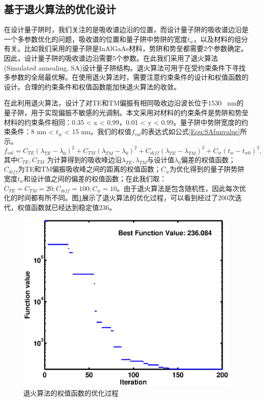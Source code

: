 \subsection{基于退火算法的优化设计}
在设计量子阱时，我们关注的是吸收谱边沿的位置，而设计量子阱的吸收谱边沿是一个多参数优化的问题，吸收谱的位置和量子阱中势阱的宽度$t_w$，以及材料的组分有关。比如我们采用的量子阱是InAlGaAs材料，势阱和势垒都需要2个参数确定。因此，设计量子阱的吸收谱边沿需要5个参数。在此我们采用了退火算法(Simulated annealing, SA)\cite{Kirkpatrick671}设计量子阱结构。退火算法可用于在受约束条件下寻找多参数的全局最优解。在使用退火算法时，需要注意约束条件的设计和权值函数的设计。合理的约束条件和权值函数能加快退火算法的收敛。

在此利用退火算法，设计了对TE和TM偏振有相同吸收边沿波长位于1530~ nm的量子阱，用于实现偏振不敏感的光调制。本文采用对材料的约束条件是势阱和势垒材料的约束条件相同：0.35 < x < 0.99，0.01 < y < 0.99。量子阱中势阱宽度的约束条件：8 nm < $t_w$ < 15 nm。我们的权值$f_{val}$的表达式如公式\ref{Equ:SAfunvalue}所示。
\begin{equation}
\label{Equ:SAfunvalue}
f_{val} = C_{TE}(\lambda_{TE}-\lambda_{0})^2 + C_{TM}(\lambda_{TM}-\lambda_{0})^2 + C_{diff}(\lambda_{TE}-\lambda_{TM})^2 + C_{w}(t_w-t_{w0})^2,
\end{equation}
其中$C_{TE}, C_{TM}$ 为计算得到的吸收峰边沿$\lambda_{TE}, \lambda_{TM}$与设计值$\lambda_{0}$偏差的权值函数； $C_{diff}$为TE和TM偏振吸收峰之间的距离的权值函数；$C_{w}$为优化得到的量子阱势阱宽度$t_w$和设计值之间的偏差的权值函数；在此我们取：$C_{TE} = C_{TM} = 20; C_{diff} = 100; C_{w} = 10$。由于退火算法是包含随机性，因此每次优化的时间都有所不同。图\ref{fig_ch2_fast_annealing}展示了退火算法的优化过程，可以看到经过了200次迭代，权值函数就已经达到稳定值236。
\begin{figure}[htb]
	\centering
	\includegraphics[width=12cm]{./Pictures/fig_ch2_fast_annealing.eps}
	\caption{退火算法的权值函数的优化过程}
	\label{fig_ch2_fast_annealing}
\end{figure}
